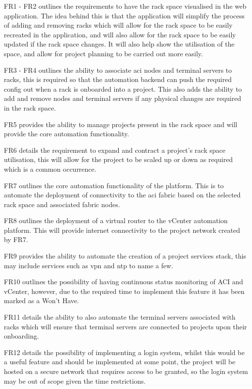 FR1 - FR2 outlines the requirements to have the rack space visualised in the web application. The idea behind this is that the application will simplify the process of adding and removing racks which will allow for the rack space to be easily recreated in the application, and will also allow for the rack space to be easily updated if the rack space changes.
It will also help show the utilisation of the space, and allow for project planning to be carried out more easily.

FR3 - FR4 outlines the ability to associate \gls{aci} nodes and terminal servers to racks, this is required so that the automation backend can push the required config out when a rack is onboarded into a project. This also adds the ability to add and remove nodes and terminal servers if any physical changes are required in the rack space.

FR5 provides the ability to manage projects present in the rack space and will provide the core automation functionality.

FR6 details the requirement to expand and contract a project's rack space utilisation, this will allow for the project to be scaled up or down as required which is a common occurrence.

FR7 outlines the core automation functionality of the platform. This is to automate the deployment of connectivity to the \gls{aci} fabric based on the selected rack space and associated fabric nodes.

FR8 outlines the deployment of a virtual router to the vCenter automation platform. This will provide internet connectivity to the project network created by FR7.

FR9 provides the ability to automate the creation of a project services stack, this may include services such as \gls{vpn} and \gls{ntp} to name a few.

FR10 outlines the possibility of having continuous status monitoring of ACI and vCenter, however, due to the required time to implement this feature it has been marked as a Won’t Have.

FR11 details the ability to also automate the terminal servers associated with racks which will ensure that terminal servers are connected to projects upon their onboarding.

FR12 details the possibility of implementing a login system, whilst this would be a useful feature and should be implemented at some point, the project will be hosted on a secure network that requires access to be granted, so the login system may be out of scope given the time restrictions.
